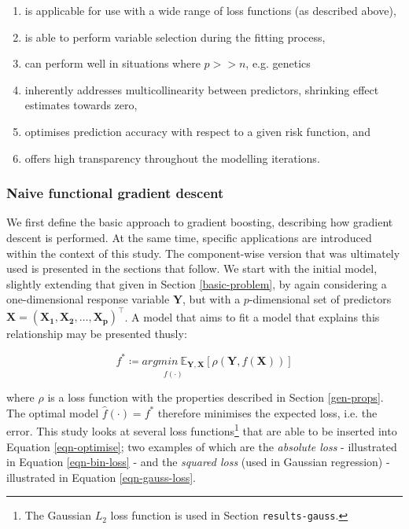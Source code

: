 \documentclass{article}
\begin{document}
\begin{enumerate}
\item is applicable for use with a wide range of loss functions (as described above),
\item is able to perform variable selection during the fitting process,
\item can perform well in situations where $p>>n$, e.g. genetics
\item inherently addresses multicollinearity between predictors, shrinking effect estimates towards zero,
\item optimises prediction accuracy with respect to a given risk function, and
\item offers high transparency throughout the modelling iterations.
\end{enumerate}


\subsubsection{Naive functional gradient descent \label{naive-boosting}}
\label{sec-1-3-3}

We first define the basic approach to gradient boosting, describing how gradient descent is performed. At the same time, specific applications are introduced within the context of this study. The component-wise version that was ultimately used is presented in the sections that follow.
We start with the initial model, slightly extending that given in Section \ref{basic-problem}, by again considering a one-dimensional response variable $\mathbf{Y}$, but with a $p$-dimensional set of predictors $\mathbf{X = (X_1, X_2, … , X_p)^\top}$. A model that aims to fit a model that explains this relationship may be presented thusly:

\begin{equation}
  f^* \coloneqq \underset{f(\cdot)}{argmin{\ \mathbb{E}_{\mathbf{Y,X}}}}[\rho (\mathbf{Y}, f(\mathbf{X}))]
      \label{eqn-optimise}
\end{equation}

\vspace{3mm}

where $\rho$ is a loss function with the properties described in Section \ref{gen-props}. The optimal model $\hat f(\cdot) = f^*$ therefore minimises the expected loss, i.e. the error. This study looks at several loss functions\footnote{The Gaussian $L_2$ loss function is used in Section \texttt{results-gauss}.} that are able to be inserted into Equation \eqref{eqn-optimise}; two examples of which are the \emph{absolute loss} - illustrated in Equation \eqref{eqn-bin-loss} - and the \emph{squared loss} (used in Gaussian regression) - illustrated in Equation \eqref{eqn-gauss-loss}.
\end{document}
